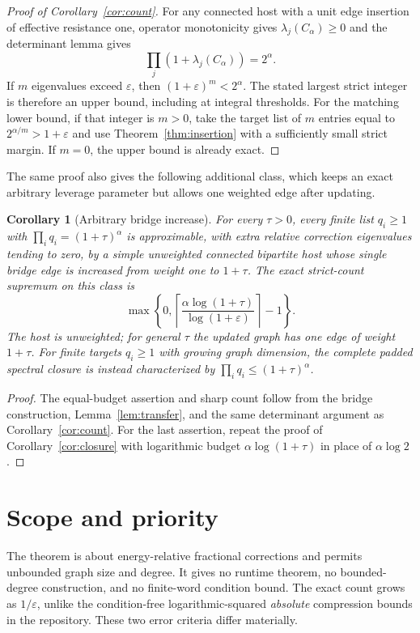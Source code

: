 \documentclass[11pt]{article}
\newtheorem{corollary}[theorem]{Corollary}
\begin{document}
\begin{proof}[Proof of Corollary~\ref{cor:count}]
For any connected host with a unit edge insertion of effective
resistance one, operator monotonicity gives $\lambda_j(C_\alpha)\ge0$
and the determinant lemma gives
\[
 \prod_j(1+\lambda_j(C_\alpha))=2^\alpha.
\]
If $m$ eigenvalues exceed $\varepsilon$, then
$(1+\varepsilon)^m<2^\alpha$. The stated largest strict integer is
therefore an upper bound, including at integral thresholds.
For the matching lower bound, if that integer is $m>0$, take the
target list of $m$ entries equal to $2^{\alpha/m}>1+\varepsilon$
and use Theorem~\ref{thm:insertion} with a sufficiently small strict
margin. If $m=0$, the upper bound is already exact.
\end{proof}

The same proof also gives the following additional class, which keeps
an exact arbitrary leverage parameter but allows one weighted edge
after updating.
\begin{corollary}[Arbitrary bridge increase]\label{cor:bridge}
For every $\tau>0$, every finite list $q_i\ge1$ with
$\prod_iq_i=(1+\tau)^\alpha$ is approximable, with extra relative
correction eigenvalues tending to zero, by a simple unweighted
connected bipartite host whose single bridge edge is increased from
weight one to $1+\tau$.
The exact strict-count supremum on this class is
\[
 \max\left\{0,\left\lceil
    \frac{\alpha\log(1+\tau)}{\log(1+\varepsilon)}
                           \right\rceil-1\right\}.
\]
The host is unweighted; for general $\tau$ the updated graph has one
edge of weight $1+\tau$.
For finite targets $q_i\ge1$ with growing graph dimension, the complete
padded spectral closure is instead characterized by
$\prod_i q_i\le(1+\tau)^\alpha$.
\end{corollary}
\begin{proof}
The equal-budget assertion and sharp count follow from the bridge
construction, Lemma~\ref{lem:transfer}, and the same determinant
argument as Corollary~\ref{cor:count}.
For the last assertion, repeat the proof of Corollary~\ref{cor:closure}
with logarithmic budget $\alpha\log(1+\tau)$ in place of
$\alpha\log2$.
\end{proof}

\section{Scope and priority}
The theorem is about energy-relative fractional corrections and permits
unbounded graph size and degree. It gives no runtime theorem, no
bounded-degree construction, and no finite-word condition bound.
The exact count grows as $1/\varepsilon$, unlike the condition-free
logarithmic-squared \emph{absolute} compression bounds in the
repository. These two error criteria differ materially.
\end{document}
